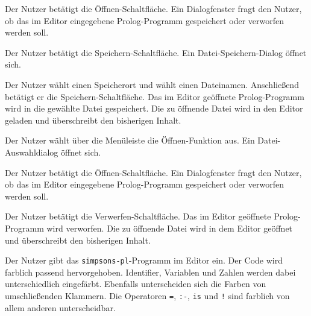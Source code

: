 \documentclass[parskip=full,11pt,twoside]{scrartcl}
\begin{document}
{Der Nutzer betätigt die Öffnen-Schaltfläche.}
{Ein Dialogfenster fragt den Nutzer, ob das im Editor eingegebene Prolog-Programm gespeichert oder verworfen werden soll.}

{Der Nutzer betätigt die Speichern-Schaltfläche.}
{Ein Datei-Speichern-Dialog öffnet sich.}

{Der Nutzer wählt einen Speicherort und wählt einen Dateinamen. Anschließend betätigt er die Speichern-Schaltfläche.}
{Das im Editor geöffnete Prolog-Programm wird in die gewählte Datei gespeichert. Die zu öffnende Datei wird in den Editor geladen und überschreibt den bisherigen Inhalt.}



{Der Nutzer wählt über die Menüleiste die Öffnen-Funktion aus.}
{Ein Datei-Auswahldialog öffnet sich.}

{Der Nutzer betätigt die Öffnen-Schaltfläche.}
{Ein Dialogfenster fragt den Nutzer, ob das im Editor eingegebene Prolog-Programm gespeichert oder verworfen werden soll.}

{Der Nutzer betätigt die Verwerfen-Schaltfläche.}
{Das im Editor geöffnete Prolog-Programm wird verworfen. Die zu öffnende Datei wird in dem Editor geöffnet und überschreibt den bisherigen Inhalt.}



{Der Nutzer gibt das \texttt{simpsons-pl}-Programm im Editor ein.}
{Der Code wird farblich passend hervorgehoben. Identifier, Variablen und Zahlen werden dabei unterschiedlich eingefärbt. Ebenfalls unterscheiden sich die Farben von umschließenden Klammern. Die Operatoren \texttt{=}, \texttt{:-}, \texttt{is} und \texttt{!} sind farblich von allem anderen unterscheidbar.}
\end{document}
